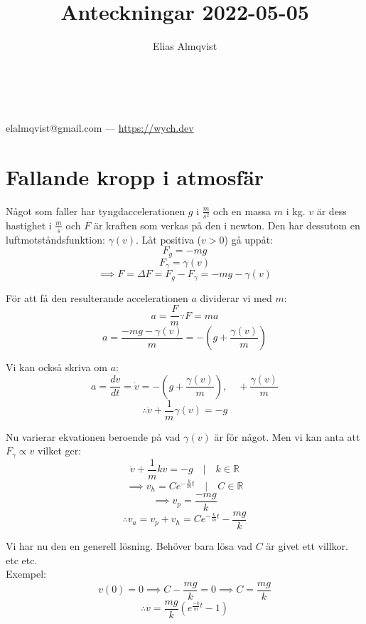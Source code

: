 \documentclass{article}
\makeatletter
\renewcommand{\maketitle}{
	\begin{center}
		{\huge\bfseries\thetitle}\\
		\vspace{1em}
		{\Large\theauthor} \\
		\vspace{1em}
		elalmqvist@gmail.com --- \url{https://wych.dev}
	\end{center}
}
\makeatother
\begin{document}
\title{Anteckningar 2022-05-05}
\author{Elias Almqvist}

\maketitle
\newpage

\section{Fallande kropp i atmosfär}
Något som faller har tyngdaccelerationen $g$ i $\frac{m}{s^2}$ och en massa $m$ i kg. $v$ är dess hastighet i $\frac{m}{s}$ och $F$ är kraften som verkas på den i newton. Den har dessutom en luftmotståndsfunktion: $\gamma(v)$. Låt positiva ($v > 0$) gå uppåt:
$$
F_g = -mg
$$
$$
F_\gamma = \gamma(v)
$$
$$
\implies F = \Delta F = F_g - F_\gamma = -mg - \gamma(v)
$$

För att få den resulterande accelerationen $a$ dividerar vi med $m$:
$$
a = \frac{F}{m} \because F = ma
$$
$$
a = \frac{-mg - \gamma(v)}{m} = -\left(g + \frac{\gamma(v)}{m}\right)
$$

Vi kan också skriva om $a$:
$$
a = \frac{dv}{dt} = \dot{v} = -\left(g + \frac{\gamma(v)}{m}\right), \quad +\frac{\gamma(v)}{m}
$$
$$
\therefore \dot{v} + \frac{1}{m} \gamma(v) = -g
$$

Nu varierar ekvationen beroende på vad $\gamma(v)$ är för något. Men vi kan anta att $F_\gamma \propto v$ vilket ger:
$$
\dot{v} + \frac{1}{m} kv = -g \quad | \quad k \in \mathbb{R}
$$
$$
\implies v_h = Ce^{-\frac{k}{m} t} \quad | \quad C \in \mathbb{R}
$$
$$
\implies v_p = \frac{-mg}{k}
$$
$$
\therefore v_a = v_p + v_h = Ce^{-\frac{k}{m} t} - \frac{mg}{k}
$$

Vi har nu den en generell lösning. Behöver bara lösa vad $C$ är givet ett villkor. etc etc. \\
Exempel:
$$
v(0) = 0 \implies C - \frac{mg}{k} = 0 \implies C = \frac{mg}{k}
$$
$$
\therefore v = \frac{mg}{k} \left( e^{\frac{-k}{m}t} - 1 \right)
$$
\end{document}
